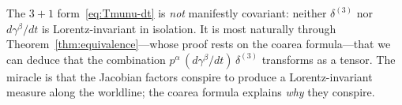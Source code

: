 \begin{remark}
  The $3{+}1$ form~\eqref{eq:Tmunu-dt} is \emph{not} manifestly
  covariant: neither $\delta^{(3)}$ nor $d\gamma^\beta/dt$ is
  Lorentz-invariant in isolation.  It is most naturally through
  Theorem~\ref{thm:equivalence}---whose proof rests on the coarea
  formula---that we can deduce that the combination
  $p^\alpha\,(d\gamma^\beta/dt)\,\delta^{(3)}$ transforms as a
  tensor.  The miracle is that the Jacobian factors conspire to
  produce a Lorentz-invariant measure along the worldline; the
  coarea formula explains \emph{why} they conspire.
\end{remark}
